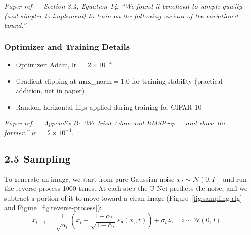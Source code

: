 \documentclass{article}
\newcommand{\paperref}[1]{{\color{paperrefcolor}\emph{#1}}}
\begin{document}
\paperref{Paper ref --- Section 3.4, Equation 14: ``We found it beneficial to sample quality (and simpler to implement) to train on the following variant of the variational bound.''}

\subsubsection*{Optimizer and Training Details}

\begin{itemize}
    \item Optimizer: Adam, lr $= 2 \times 10^{-4}$
    \item Gradient clipping at max\_norm$=1.0$ for training stability (practical addition, not in paper)
    \item Random horizontal flips applied during training for CIFAR-10
\end{itemize}

\paperref{Paper ref --- Appendix B: ``We tried Adam and RMSProp \ldots\ and chose the former.'' lr $= 2 \times 10^{-4}$.}

\subsection{2.5 \; Sampling}

To generate an image, we start from pure Gaussian noise $x_T \sim \mathcal{N}(0, I)$ and run the reverse process 1000 times. At each step the U-Net predicts the noise, and we subtract a portion of it to move toward a clean image (Figure~\ref{fig:sampling-alg} and Figure~\ref{fig:reverse-process}):
\[
x_{t-1} = \frac{1}{\sqrt{\alpha_t}}\!\left(x_t - \frac{1-\alpha_t}{\sqrt{1-\bar{\alpha}_t}}\,\varepsilon_\theta(x_t,t)\right) + \sigma_t\,z, \quad z \sim \mathcal{N}(0,I)
\]
\end{document}
